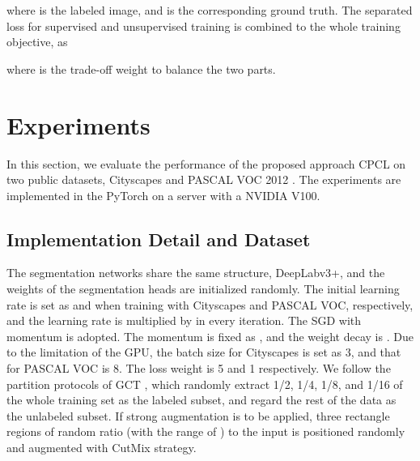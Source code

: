 \documentclass[journal]{IEEEtran}
\begin{document}
where  is the labeled image, and  is the corresponding ground truth. The separated loss for supervised and unsupervised training is combined to 
the whole training objective, as

where  is the trade-off weight to balance the two parts.

\section{Experiments}
In this section, we evaluate the performance of the proposed approach CPCL on two public datasets, Cityscapes \cite{Cityscapes} and PASCAL VOC 2012 \cite{pascalvoc}. 
The experiments are implemented in the PyTorch on a server with a NVIDIA V100.

\subsection{Implementation Detail and Dataset}
The segmentation networks share the same structure, DeepLabv3+, and the weights of the segmentation heads are initialized randomly. The initial learning rate is 
set as  and  when training with Cityscapes and PASCAL VOC, respectively, and the learning rate is multiplied by  
in every iteration. The SGD with momentum is adopted. The momentum is fixed as , and the weight decay is . Due to the limitation of the GPU, 
the batch size for Cityscapes is set as 3, and that for PASCAL VOC is 8. The loss weight  is 5 and 1 respectively. We follow the partition protocols of GCT \cite{GCT}, which randomly extract 1/2, 1/4, 1/8, and 1/16 
of the whole training set as the labeled subset, and regard the rest of the data as the unlabeled subset. If strong augmentation is to be applied, three rectangle 
regions of random ratio (with the range of ) to the input is positioned randomly and augmented with CutMix strategy. 
\end{document}
